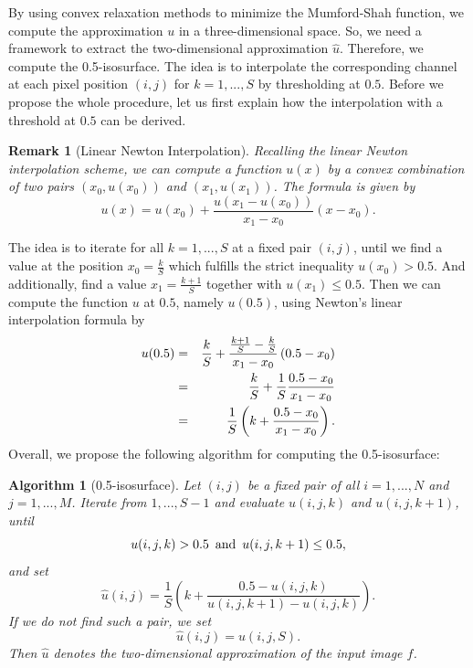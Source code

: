 \documentclass[abstracton]{scrreprt}
\newtheorem{remark}[theorem]{Remark}
\newtheorem{algorithm}[theorem]{Algorithm}
\begin{document}
        By using convex relaxation methods to minimize the Mumford-Shah function, we compute the approximation $u$ in a three-dimensional space. So, we need a framework to extract the two-dimensional approximation $\hat{u}$. Therefore, we compute the 0.5-isosurface. The idea is to interpolate the corresponding channel at each pixel position $(i,j)$ for $k = 1, ..., S$ by thresholding at $0.5$. Before we propose the whole procedure, let us first explain how the interpolation with a threshold at $0.5$ can be derived.
        \begin{remark}[Linear Newton Interpolation]
            Recalling the linear Newton interpolation scheme, we can compute a function $u(x)$ by a convex combination of two pairs $(x_{0}, u(x_{0}))$ and $(x_{1}, u(x_{1}))$. The formula is given by
                $$
                    u(x) = u(x_{0}) + \frac{u(x_{1} - u(x_{0}))}{x_{1} - x_{0}}\left( x - x_{0} \right).
                $$
        \end{remark}
        The idea is to iterate for all $k = 1, ..., S$ at a fixed pair $(i,j)$, until we find a value at the position $x_{0} = \frac{k}{S}$ which fulfills the strict inequality $u(x_{0}) > 0.5$. And additionally, find a value $x_{1} = \frac{k+1}{S}$ together with $u(x_{1}) \le 0.5$. Then we can compute the function $u$ at $0.5$, namely $u(0.5)$, using Newton's linear interpolation formula by
            \begin{eqnarray}
                u(0.5) &=& \frac{k}{S} + \frac{\frac{k+1}{S} - \frac{k}{S}}{x_{1} - x_{0}} \left( 0.5 - x_{0} \right) \notag \\
                &=& \frac{k}{S} + \frac{1}{S} \frac{0.5 - x_{0}}{x_{1} - x_{0}} \notag \\
                &=& \frac{1}{S} \left( k + \frac{0.5 - x_{0}}{x_{1} - x_{0}} \right). \notag
            \end{eqnarray}
        Overall, we propose the following algorithm for computing the 0.5-isosurface:
        \begin{algorithm}[0.5-isosurface]
            \label{alg:0.5_isosurface}
            Let $(i,j)$ be a fixed pair of all $i = 1, ..., N$ and $j = 1,..., M$. Iterate from $1, ..., S-1$ and evaluate $u(i,j,k)$ and $u(i,j,k+1)$, until
                $$
                    u(i,j,k) > 0.5 \,\,\, \textnormal{and} \,\,\, u(i,j,k+1) \le 0.5,
                $$
            and set
                $$
                    \hat{u}(i,j) = \frac{1}{S} \left( k + \frac{0.5 - u(i,j,k)}{u(i,j,k+1) - u(i,j,k)} \right).
                $$
            If we do not find such a pair, we set
                $$
                    \hat{u}(i,j) = u(i, j, S).
                $$
            Then $\hat{u}$ denotes the two-dimensional approximation of the input image $f$.
        \end{algorithm}
\end{document}
